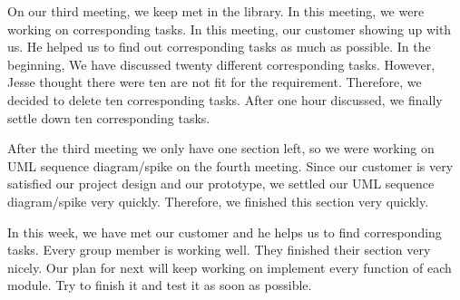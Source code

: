 \documentclass[12pt]{article}
\begin{document}
 \par
 On our third meeting, we keep met in the library. In this meeting, we were working on corresponding tasks. In this meeting, our customer showing up with us. He helped us to find out corresponding tasks as much as possible. In the beginning, We have discussed twenty different corresponding tasks. However, Jesse thought there were ten are not fit for the requirement. Therefore, we decided to delete ten corresponding tasks.  After one hour discussed, we finally settle down ten corresponding tasks. \\
 
 \par
 After the third meeting we only have one section left, so we were working on UML sequence diagram/spike on the fourth meeting. Since our customer is very satisfied our project design and our prototype, we settled our UML sequence diagram/spike very quickly. Therefore, we finished this section very quickly. \\
 
 \par
 In this week, we have met our customer and he helps us to find corresponding tasks. Every group member is working well. They finished their section very nicely. Our plan for next will keep working on implement every function of each module. Try to finish it and test it as soon as possible. \\
\end{document}
